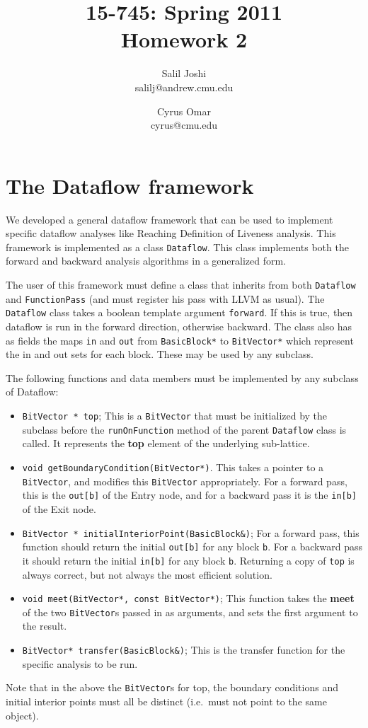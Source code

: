 \documentclass[12pt]{article}
\title{{\small 15-745: Spring 2011}\\Homework 2}
\author{Salil Joshi\\
salilj@andrew.cmu.edu
\and
Cyrus Omar\\
cyrus@cmu.edu
}
\date{}                                           %
\begin{document}
\maketitle
\section{The Dataflow framework}
We developed a general dataflow framework that can be used to implement specific dataflow analyses like Reaching Definition of Liveness analysis. This framework is implemented as a class \verb|Dataflow|. This class implements both the forward and backward analysis algorithms in a generalized form.

The user of this framework must define a class that inherits from both \verb|Dataflow| and \verb|FunctionPass| (and must register his pass with LLVM as usual). The \verb|Dataflow| class takes a boolean template argument \verb|forward|. If this is true, then dataflow is run in the forward direction, otherwise backward. The class also has as fields the maps \verb|in| and \verb|out| from \verb|BasicBlock*| to \verb|BitVector*| which represent the in and out sets for each block. These may be used by any subclass.

The following functions and data members must be implemented by any subclass of Dataflow:
\begin{itemize}
\item \verb|BitVector * top|; This is a \verb|BitVector| that must be initialized by the subclass before the \verb|runOnFunction| method of the parent \verb|Dataflow| class is called. It represents the \textbf{top} element of the underlying sub-lattice.
\item \verb|void getBoundaryCondition(BitVector*)|. This takes a pointer to a \verb|BitVector|, and modifies this \verb|BitVector| appropriately. For a forward pass, this is the \verb|out[b]| of the Entry node, and for a backward pass it is the \verb|in[b]| of the Exit node.
\item \verb|BitVector * initialInteriorPoint(BasicBlock&)|; For a forward pass, this function should return the initial \verb|out[b]| for any block \verb|b|. For a backward pass it should return the initial \verb|in[b]| for any block \verb|b|. Returning a copy of \verb|top| is always correct, but not always the most efficient solution.

\item \verb|void meet(BitVector*, const BitVector*)|; This function takes the \textbf{meet} of the two \verb|BitVector|s passed in as arguments, and sets the first argument to the result.

\item \verb|BitVector* transfer(BasicBlock&)|; This is the transfer function for the specific analysis to be run.
\end{itemize}
Note that in the above the \verb|BitVector|s for top, the boundary conditions and initial interior points must all be distinct (i.e.\ must not point to the same object).
\end{document}
